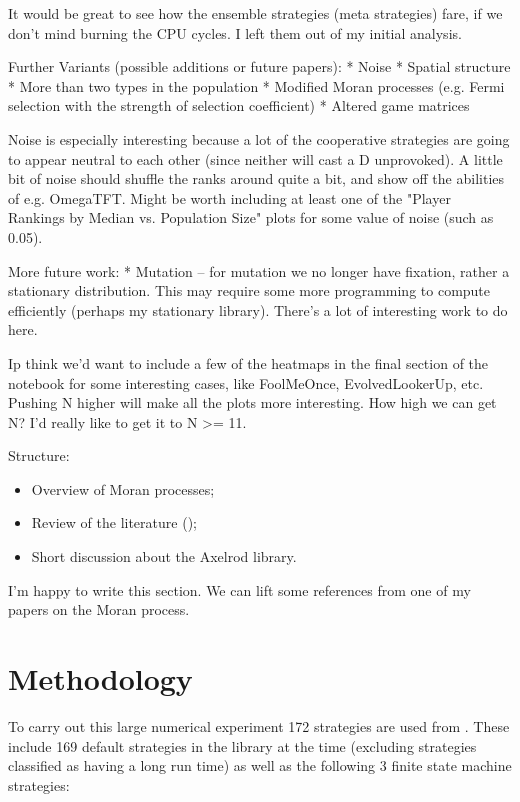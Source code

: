 \documentclass{article}
\begin{document}
It would be great to see how the ensemble strategies (meta strategies) fare, if
we don't mind burning the CPU cycles. I left them out of my initial analysis.

Further Variants (possible additions or future papers): * Noise * Spatial
structure * More than two types in the population * Modified Moran processes
(e.g. Fermi selection with the strength of selection coefficient) * Altered game
matrices

Noise is especially interesting because a lot of the cooperative strategies are
going to appear neutral to each other (since neither will cast a D unprovoked).
A little bit of noise should shuffle the ranks around quite a bit, and show off
the abilities of e.g. OmegaTFT. Might be worth including at least one of the
"Player Rankings by Median vs. Population Size" plots for some value of noise
(such as 0.05).

More future work: * Mutation -- for mutation we no longer have fixation, rather
a stationary distribution. This may require some more programming to compute
efficiently (perhaps my stationary library). There's a lot of interesting work
to do here.

Ip think we'd want to include a few of the heatmaps in the final section of the
notebook for some interesting cases, like FoolMeOnce, EvolvedLookerUp, etc.
Pushing N higher will make all the plots more interesting. How high we can get
N? I'd really like to get it to N >= 11.

Structure:

\begin{itemize}
    \item Overview of Moran processes;
    \item Review of the literature (\cite{Lee2015, Nowak});
    \item Short discussion about the Axelrod library.
\end{itemize}

I'm happy to write this section. We can lift some references from one of my
papers on the Moran process.

\section{Methodology}\label{sec:methodology}

To carry out this large numerical experiment 172 strategies are used from
\cite{axelrodproject}. These include 169 default strategies in the library at
the time (excluding strategies classified as having a long run time) as well as
the following 3 finite state machine strategies:
\end{document}
